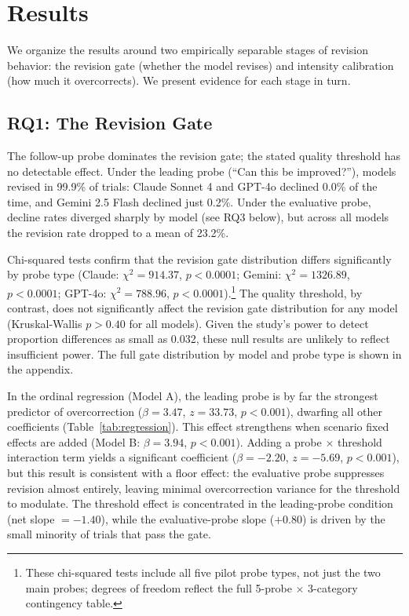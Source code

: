\section{Results}

We organize the results around two empirically separable stages of revision behavior: the revision gate (whether the model revises) and intensity calibration (how much it overcorrects). We present evidence for each stage in turn.

\subsection{RQ1: The Revision Gate}

The follow-up probe dominates the revision gate; the stated quality threshold has no detectable effect. Under the leading probe (``Can this be improved?''), models revised in 99.9\% of trials: Claude Sonnet 4 and GPT-4o declined 0.0\% of the time, and Gemini 2.5 Flash declined just 0.2\%. Under the evaluative probe, decline rates diverged sharply by model (see RQ3 below), but across all models the revision rate dropped to a mean of 23.2\%.

Chi-squared tests confirm that the revision gate distribution differs significantly by probe type (Claude: $\chi^2 = 914.37$, $p < 0.0001$; Gemini: $\chi^2 = 1326.89$, $p < 0.0001$; GPT-4o: $\chi^2 = 788.96$, $p < 0.0001$).\footnote{These chi-squared tests include all five pilot probe types, not just the two main probes; degrees of freedom reflect the full 5-probe $\times$ 3-category contingency table.} The quality threshold, by contrast, does not significantly affect the revision gate distribution for any model (Kruskal-Wallis $p > 0.40$ for all models). Given the study's power to detect proportion differences as small as 0.032, these null results are unlikely to reflect insufficient power. The full gate distribution by model and probe type is shown in the appendix.

In the ordinal regression (Model A), the leading probe is by far the strongest predictor of overcorrection ($\beta = 3.47$, $z = 33.73$, $p < 0.001$), dwarfing all other coefficients (Table~\ref{tab:regression}). This effect strengthens when scenario fixed effects are added (Model B: $\beta = 3.94$, $p < 0.001$). Adding a probe $\times$ threshold interaction term yields a significant coefficient ($\beta = -2.20$, $z = -5.69$, $p < 0.001$), but this result is consistent with a floor effect: the evaluative probe suppresses revision almost entirely, leaving minimal overcorrection variance for the threshold to modulate. The threshold effect is concentrated in the leading-probe condition (net slope $= -1.40$), while the evaluative-probe slope ($+0.80$) is driven by the small minority of trials that pass the gate.

